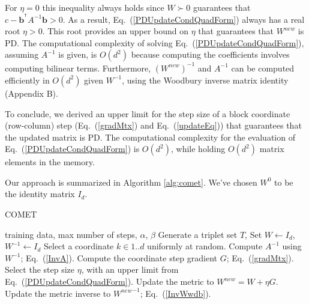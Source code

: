 \documentclass{article} %
\newcommand\todo[1]{\textbf{<ToDo:#1}!}
\newcommand\mat[1]{{#1}}
\renewcommand\vec[1]{\mathbf{#1}}
\newcommand{\T}{{}^\mathsf{T}}
\newcommand{\W}{\mat{W}}
\newcommand{\newW}{{\mat{W^{new}}}}
\newcommand{\ignore}[1]{}
\newcommand{\B}{\vec{b}}
\newcommand{\C}{c}
\newcommand{\invA}{A^{-1}}
\newcommand{\uscalar}{{u}_{1}}
\newcommand{\uvec}{\vec{u}_{2:d}}
\newcommand{\Wvec}{\W_{2:d,1}}
\newcommand{\Wscalar}{\W_{1,1}}
\renewcommand{\eqref}[1]{Eq.~(\ref{#1})}
\begin{document}
\ignore{
\begin{equation}
  \begin{array}{ll} 
    (\uvec\T \invA \uvec) \, \eta^2 \\
    -2(\uscalar - \uvec\T \invA \B) \,\eta \\
    -(\C - \B\T  \invA \B) & < 0 \quad .
  \end{array}
\end{equation}
}


For $\eta = 0$ this inequality always
holds since $\W \succ 0$ guarantees that $\C-\B^{\T} \invA \B >0$. As a result,
 \eqref{PDUpdateCondQuadForm} always has a real
root $\eta > 0$. This root provides an upper bound on $\eta$ that guarantees that $\newW$ is PD. The computational complexity of solving \eqref{PDUpdateCondQuadForm}, assuming $\invA$ is given, is $O(d^2)$ because computing the coefficients involves computing bilinear terms.
Furthermore, $(\newW)^{-1}$ and $\invA$ can be computed efficiently in $O(d^2)$ given $\W^{-1}$, using the Woodbury inverse matrix identity (Appendix B).

To conclude, we derived an upper limit for the step size of a block coordinate (row-column) step (\eqref{gradMtx} and \eqref{updateEq}) that guarantees that the updated matrix is PD. The computational complexity for the evaluation
of \eqref{PDUpdateCondQuadForm} is $O(d^2)$, while holding $O(d^2)$ matrix elements in the memory.
\ignore{\todo{Discuss numerical stability ?}}
Our approach is summarized in Algorithm \ref{alg:comet}. We've chosen $\W^0$ to be the identity matrix $I_d$.

\begin{algorithm}[tb]
   \caption{COMET}
   \label{alg:comet}
\begin{algorithmic}[1]
    training data, max number of steps, $\alpha$, $\beta$
   \STATE Generate a triplet set $T$, Set  $\W  \leftarrow I_d$, $\W^{-1}  \leftarrow I_d$
   \REPEAT 
   \STATE Select a coordinate $k \in {1..d}$ uniformly at random.
   \STATE Compute $\invA$ using $\W^{-1}$; \eqref{InvA}.
   \STATE Compute the coordinate step gradient $G$; \eqref{gradMtx}.
   \STATE Select the step size $\eta$, with an upper limit from \eqref{PDUpdateCondQuadForm}.
   \STATE Update the metric to $\newW=\W+\eta G$.
   \STATE Update the metric inverse to $\newW^{-1}$; \eqref{InvWwdb}.
\end{algorithmic}
\end{algorithm}
\end{document}
